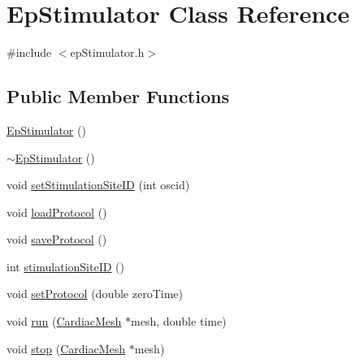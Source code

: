 \hypertarget{class_ep_stimulator}{\section{Ep\+Stimulator Class Reference}
\label{class_ep_stimulator}
}


{\ttfamily \#include $<$ep\+Stimulator.\+h$>$}

\subsection*{Public Member Functions}
\begin{DoxyCompactItemize}
\item 
\hyperlink{class_ep_stimulator_a13c6a1ee09dac6e681c23a4b9e942a58}{Ep\+Stimulator} ()
\item 
\hyperlink{class_ep_stimulator_a2ec12a7fa398e175ad6f60294f749db8}{$\sim$\+Ep\+Stimulator} ()
\item 
void \hyperlink{class_ep_stimulator_a36d5e0a066e53bdac49e7ec00e00dc00}{set\+Stimulation\+Site\+I\+D} (int oscid)
\item 
void \hyperlink{class_ep_stimulator_a04f97ef8618295d244bb131dcd552fe6}{load\+Protocol} ()
\item 
void \hyperlink{class_ep_stimulator_a83f46c01fab069d5c68262db2a4d8044}{save\+Protocol} ()
\item 
int \hyperlink{class_ep_stimulator_a5529ac4ec9f121a834b30ab778786627}{stimulation\+Site\+I\+D} ()
\item 
void \hyperlink{class_ep_stimulator_ac437e7ba7f5c8f1311ee6676b3902d53}{set\+Protocol} (double zero\+Time)
\item 
void \hyperlink{class_ep_stimulator_a9c7b67a145c50fb0c29656f9080b9be8}{run} (\hyperlink{class_cardiac_mesh}{Cardiac\+Mesh} $\ast$mesh, double time)
\item 
void \hyperlink{class_ep_stimulator_aaad70578cdf02f00716687f55a28fb1a}{stop} (\hyperlink{class_cardiac_mesh}{Cardiac\+Mesh} $\ast$mesh)
\end{DoxyCompactItemize}


